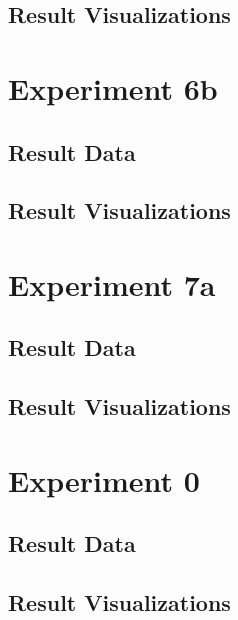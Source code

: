 	\subsection{Result Visualizations}
	\label{sec:A_Exp6a_Diagrams}

\section{Experiment 6b}
\label{sec:A_Exp6b}
	\subsection{Result Data}
	\label{sec:A_Exp6b_Data}
	\subsection{Result Visualizations}
	\label{sec:A_Exp6b_Diagrams}

\section{Experiment 7a}
\label{sec:A_Exp7a}
	\subsection{Result Data}
	\label{sec:A_Exp7a_Data}
	\subsection{Result Visualizations}
	\label{sec:A_Exp7a_Diagrams}

\section{Experiment 0}
\label{sec:A_Exp0}
	\subsection{Result Data}
	\label{sec:A_Exp0_Data}
	\subsection{Result Visualizations}
	\label{sec:A_Exp0_Diagrams}